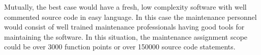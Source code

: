 Mutually, the best case would have a fresh, low complexity software with well commented source code in easy language. In this case the maintenance personnel would consist of well trained maintenance professionals having good tools for maintaining the software. In this situation, the maintenance assignment scope could be over 3000 function points or over 150000 source code statements.




